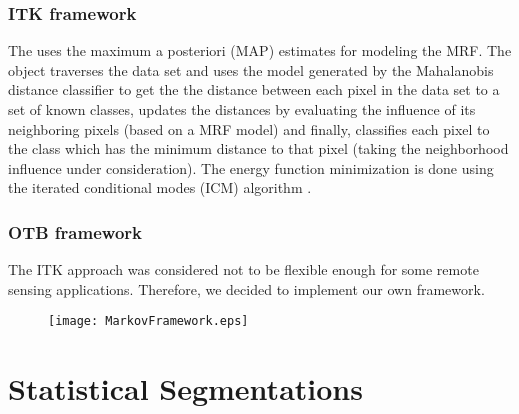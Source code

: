 \subsubsection{ITK framework}
\label{sec:MarkovRandomFieldITK}
The
 uses the maximum a posteriori (MAP)
estimates for modeling the MRF. The object traverses the data set and uses the
model generated by the Mahalanobis distance classifier to get the the distance
between each pixel in the data set to a set of known classes, updates the
distances by evaluating the influence of its neighboring pixels (based on a MRF
model) and finally, classifies each pixel to the class which has the minimum
distance to that pixel (taking the neighborhood influence under consideration).
The energy function minimization is done using the iterated conditional modes
(ICM) algorithm \cite{Besag1986}.

\ifitkFullVersion

\fi 

\subsubsection{OTB framework}
\label{sec:MarkovRandomFieldOTB}
The ITK approach was considered not to be flexible enough for some
remote sensing applications. Therefore, we decided to implement our
own framework.

\begin{figure}[th]
  \centering
  \texttt{[image: MarkovFramework.eps]}
  \label{fig:markovFramework}
\end{figure}

\ifitkFullVersion

\fi 

\ifitkFullVersion

\fi 


\ifitkFullVersion

\fi 


\section{Statistical Segmentations}
\label{sec:StatisticalSegmentations}


